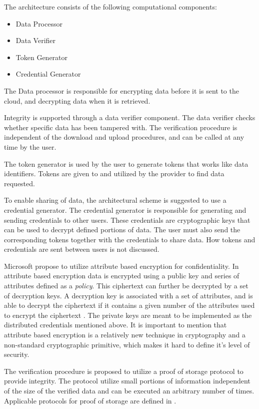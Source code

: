 \documentclass[pdftex,english,10pt,b5paper,twoside]{book}
\begin{document}
The architecture consists of the following computational components:
\begin{itemize}
  \item Data Processor
  \item Data Verifier 
  \item Token Generator  
  \item Credential Generator
\end{itemize}

The Data processor is responsible for encrypting data before it is sent to the
cloud, and decrypting data when it is retrieved.

Integrity is supported through a data verifier component. The data verifier
checks whether specific data has been tampered with. The verification procedure
is independent of the download and upload procedures, and can be called at any
time by the user. 

The token generator is used by the user to generate tokens that works like
data identifiers. Tokens are given to and utilized by the provider to
find data requested.

To enable sharing of data, the architectural scheme is suggested to use a
credential generator. The credential generator is responsible for generating
and sending credentials to other users. These credentials are cryptographic
keys that can be used to decrypt defined portions of data.  The user must also
send the corresponding tokens together with the credentials to share data. How
tokens and credentials are sent between users is not discussed.

Microsoft propose to utilize attribute based encryption for confidentiality. In
attribute based encryption data is encrypted using a public key and series of
attributes defined as a \emph{policy}. This ciphertext can further be decrypted
by a set of decryption keys. A decryption key is associated with a set of
attributes, and is able to decrypt the ciphertext if it contains a given number
of the attributes used to encrypt the ciphertext \cite{microsoftresearch}. The
private keys are meant to be implemented as the distributed credentials
mentioned above. It is important to mention that attribute based encryption is
a relatively new technique in cryptography and a non-standard cryptographic
primitive, which makes it hard to define it's level of security. 

The verification procedure is proposed to utilize a proof of storage
protocol to provide integrity. The protocol utilize small portions of
information independent of the size of the verified data and can be executed an
arbitrary number of times. Applicable protocols for proof of storage are defined
in \cite{proofofstorage1, proofofstorage2}.
\end{document}
